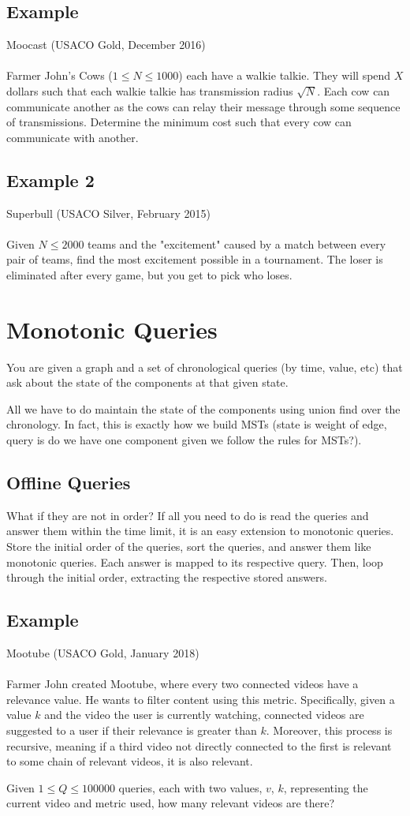 \documentclass{article}
\begin{document}
\subsection{Example}
Moocast (USACO Gold, December 2016) \\ \\
Farmer John's Cows ($1 \leq N \leq 1000$) each have a walkie talkie. They will spend $X$ dollars such that each walkie talkie has transmission radius $\sqrt{N}$. Each cow can communicate another as the cows can relay their message through some sequence of transmissions. Determine the minimum cost such that every cow can communicate with another.

\subsection{Example 2}
Superbull (USACO Silver, February 2015) \\ \\
Given $N\leq2000$ teams and the "excitement" caused by a match between every pair of teams, find the most excitement possible in a tournament.  The loser is eliminated after every game, but you get to pick who loses.

\section{Monotonic Queries}
You are given a graph and a set of chronological queries (by time, value, etc) that ask about the state of the components at that given state.

All we have to do maintain the state of the components using union find over the chronology. In fact, this is exactly how we build MSTs (state is weight of edge, query is do we have one component given we follow the rules for MSTs?).    

\subsection{Offline Queries}
What if they are not in order? If all you need to do is read the queries and answer them within the time limit, it is an easy extension to monotonic queries. Store the initial order of the queries, sort the queries, and answer them like monotonic queries. Each answer is mapped to its respective query. Then, loop through the initial order, extracting the respective stored answers.  

\subsection{Example}
Mootube (USACO Gold, January 2018) \\ \\
Farmer John created Mootube, where every two connected videos have a relevance value. He wants to filter content using this metric. Specifically, given a value $k$ and the video the user is currently watching, connected videos are suggested to a user if their relevance is greater than $k$. Moreover, this process is recursive, meaning if a third video not directly connected to the first is relevant to some chain of relevant videos, it is also relevant. 

Given $1 \leq Q \leq 100000$ queries, each with two values, $v$, $k$, representing the current video and metric used, how many relevant videos are there?
\end{document}

